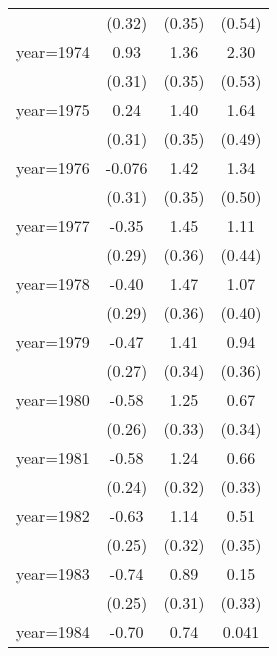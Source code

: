 \begin{sidewaystable}[htbp]
\begin{tabular}{l*{3}{c}}
                &   (0.32)         &   (0.35)         &   (0.54)         \\
\addlinespace
year=1974       &     0.93\sym{***}&     1.36\sym{***}&     2.30\sym{***}\\
                &   (0.31)         &   (0.35)         &   (0.53)         \\
\addlinespace
year=1975       &     0.24         &     1.40\sym{***}&     1.64\sym{***}\\
                &   (0.31)         &   (0.35)         &   (0.49)         \\
\addlinespace
year=1976       &   -0.076         &     1.42\sym{***}&     1.34\sym{***}\\
                &   (0.31)         &   (0.35)         &   (0.50)         \\
\addlinespace
year=1977       &    -0.35         &     1.45\sym{***}&     1.11\sym{**} \\
                &   (0.29)         &   (0.36)         &   (0.44)         \\
\addlinespace
year=1978       &    -0.40         &     1.47\sym{***}&     1.07\sym{**} \\
                &   (0.29)         &   (0.36)         &   (0.40)         \\
\addlinespace
year=1979       &    -0.47\sym{*}  &     1.41\sym{***}&     0.94\sym{**} \\
                &   (0.27)         &   (0.34)         &   (0.36)         \\
\addlinespace
year=1980       &    -0.58\sym{**} &     1.25\sym{***}&     0.67\sym{*}  \\
                &   (0.26)         &   (0.33)         &   (0.34)         \\
\addlinespace
year=1981       &    -0.58\sym{**} &     1.24\sym{***}&     0.66\sym{**} \\
                &   (0.24)         &   (0.32)         &   (0.33)         \\
\addlinespace
year=1982       &    -0.63\sym{**} &     1.14\sym{***}&     0.51         \\
                &   (0.25)         &   (0.32)         &   (0.35)         \\
\addlinespace
year=1983       &    -0.74\sym{***}&     0.89\sym{***}&     0.15         \\
                &   (0.25)         &   (0.31)         &   (0.33)         \\
\addlinespace
year=1984       &    -0.70\sym{***}&     0.74\sym{**} &    0.041         \\

\end{tabular}
\end{sidewaystable}
